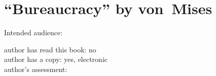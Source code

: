 \section{``Bureaucracy'' by von~Mises\label{review:vonMises_bur}}

\cite{1996_Mises}

Intended audience:

author has read this book: no\\
author has a copy: yes, electronic\\
author's assessment:
